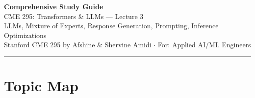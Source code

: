 \documentclass[11pt, a4paper]{article}
\begin{document}
\begin{center}
{\LARGE\bfseries\color{defblue} Comprehensive Study Guide}\\[6pt]
{\Large CME 295: Transformers \& LLMs --- Lecture 3}\\[4pt]
{\normalsize LLMs, Mixture of Experts, Response Generation, Prompting, Inference Optimizations}\\[4pt]
{\small Stanford CME 295 by Afshine \& Shervine Amidi $\cdot$ For: Applied AI/ML Engineers}\\[2pt]
\rule{\textwidth}{0.4pt}
\end{center}

\tableofcontents
\newpage

\section{Topic Map}
\end{document}
